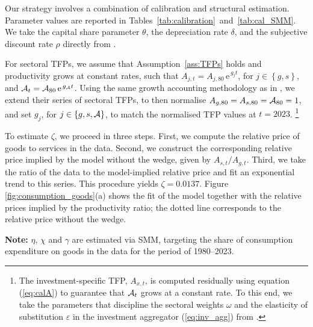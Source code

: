 \documentclass[12pt,a4paper]{article}
\begin{document}
Our strategy involves a combination of calibration and structural estimation. Parameter values are reported in Tables~\ref{tab:calibration}~and~\ref{tab:cal_SMM}. We take the capital share parameter $\theta$, the depreciation rate $\delta$, and the subjective discount rate $\rho$ directly from \cite{herrendorf_rogerson_valentinyi_2021}. 

For sectoral TFPs, we assume that Assumption~\ref{ass:TFPs} holds and productivity grows at constant rates, such that $A_{j,t}=A_{j,80}\,\text{e}^{\,g_{j} t}$, for $j \in \left\lbrace g,s \right\rbrace$, and ${\cal A}_{t} = {\cal A} _{80}\,\text{e}^{\,g_{{\cal A}} t}$. 
Using the same growth accounting methodology as in \cite{herrendorf_rogerson_valentinyi_2021}, we extend their series of sectoral TFPs,  to then normalise $A_{g,80}=A_{s,80}= {\cal A}_{80} = 1$,  and set $g_{j}$, for $j\in\{g,s,{\cal A}\}$, to match the normalised TFP values at $t=2023$.%
\footnote{The investment-specific TFP, $A_{x,t}$, is computed residually using equation (\ref{eq:calA}) to guarantee that ${\cal A}_{t}$ grows at a constant rate. To this end, we take the parameters that discipline the sectoral weights $\omega$ and the elasticity of substitution $\varepsilon$ in the investment aggregator (\ref{eq:inv_agg}) from \cite{herrendorf_rogerson_valentinyi_2021}.}

To estimate $\zeta$, we proceed in three steps. First, we compute the relative price of goods to services in the data. Second, we construct the corresponding relative price implied by the model without the wedge, given by $A_{s,t}/A_{g,t}$. Third, we take the ratio of the data to the model-implied relative price and fit an exponential trend to this series. This procedure yields $\zeta = 0.0137$. Figure \ref{fig:consumption_goods}(a) shows the fit of the model together with the relative prices implied by the productivity ratio; the dotted line corresponds to the relative price without the wedge.

\begin{table}[!t]
\caption{Preference Parameters Estimated via SMM}
\label{tab:cal_SMM}
\centering
\begin{threeparttable} 
\renewcommand{\TPTminimum}{\linewidth}
\begin{tablenotes} 

\footnotesize
\item \textbf{Note:}  $\eta$, $\chi$ and $\gamma$ are estimated via SMM, targeting the share of consumption expenditure on goods in the data for the period of 1980--2023.
\end{tablenotes} 
\end{threeparttable} 
\end{table}
\end{document}

